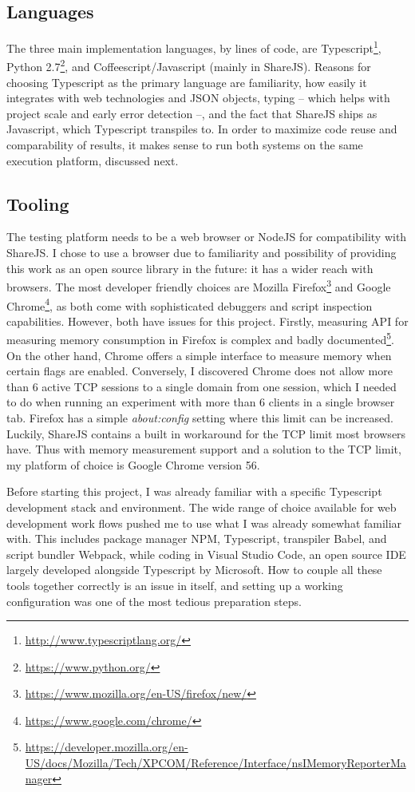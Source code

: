 \documentclass[12pt,a4paper,twoside,openright]{report}
\begin{document}
	\subsection{Languages}
	The three main implementation languages, by lines of code, are Typescript\footnote{\url{http://www.typescriptlang.org/}}, Python 2.7\footnote{\url{https://www.python.org/}}, and Coffeescript/Javascript  (mainly in ShareJS). Reasons for choosing Typescript as the primary language are familiarity, how easily it integrates with web technologies and JSON objects, typing -- which helps with project scale and early error detection --, and the fact that ShareJS ships as Javascript, which Typescript transpiles to. In order to maximize code reuse and comparability of results, it makes sense to run both systems on the same execution platform, discussed next.
	
	\subsection{Tooling}
	The testing platform needs to be a web browser or NodeJS for compatibility with ShareJS. I chose to use a browser due to familiarity and possibility of providing this work as an open source library in the future: it has a wider reach with browsers. The most developer friendly choices are Mozilla Firefox\footnote{\url{https://www.mozilla.org/en-US/firefox/new/}} and Google Chrome\footnote{\url{https://www.google.com/chrome/}}, as both come with sophisticated debuggers and script inspection capabilities. However, both have issues for this project. Firstly, measuring API for measuring memory consumption in Firefox is complex and badly documented\footnote{\url{https://developer.mozilla.org/en-US/docs/Mozilla/Tech/XPCOM/Reference/Interface/nsIMemoryReporterManager}}. On the other hand, Chrome offers a simple interface to measure memory when certain flags are enabled. Conversely, I discovered Chrome does not allow more than 6 active TCP sessions to a single domain from one session, which I needed to do when running an experiment with more than 6 clients in a single browser tab. Firefox has a simple \textit{about:config} setting where this limit can be increased. Luckily, ShareJS contains a built in workaround for the TCP limit most browsers have. Thus with memory measurement support and a solution to the TCP limit, my platform of choice is Google Chrome version 56.
	
	Before starting this project, I was already familiar with a specific Typescript development stack and environment. The wide range of choice available for web development work flows pushed me to use what I was already somewhat familiar with. This includes package manager NPM, Typescript, transpiler Babel, and script bundler Webpack, while coding in Visual Studio Code, an open source IDE largely developed alongside Typescript by Microsoft. How to couple all these tools together correctly is an issue in itself, and setting up a working configuration was one of the most tedious preparation steps.
	
\end{document}

